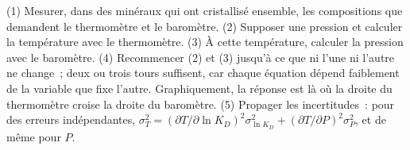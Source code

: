 \begin{method}\label{met:b2:pt-paths:intersection}
(1) Mesurer, dans des minéraux qui ont cristallisé ensemble, les compositions que demandent le thermomètre et le
baromètre. (2) Supposer une pression et calculer la température avec le thermomètre.
(3) À cette température, calculer la pression avec le baromètre. (4) Recommencer (2) et (3)
jusqu'à ce que ni l'une ni l'autre ne change~; deux ou trois tours suffisent, car chaque équation dépend faiblement de
la variable que fixe l'autre. Graphiquement, la réponse est là où la droite du
thermomètre croise la droite du baromètre. (5) Propager les incertitudes~: pour
des erreurs indépendantes, $\sigma_T^2 = (\partial T/\partial\ln K_D)^2\sigma_{\ln K_D}^2 +
(\partial T/\partial P)^2\sigma_P^2$, et de même pour $P$.
\end{method}

